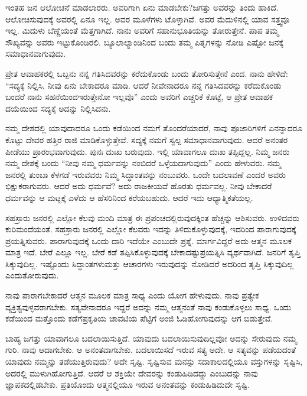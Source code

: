 ಇಂತಹ ಜನ ಆಲೋಚನೆ ಮಾಡಲಾರರು. ಅವರಿಗಾಗಿ ಏನು ಮಾಡಬೇಕು?\break ಜಗತ್ತು ಅವರನ್ನು ತಿಂದು ಹಾಕಿದೆ. ಆಲೋಚಿಸುವುದಕ್ಕೆ ಅವರಲ್ಲಿ ಏನೂ ಇಲ್ಲ. ಅವರ ಮೂಳೆಗಳು ಟೊಳ್ಳಾಗಿವೆ. ಅವರ ಮೆದುಳಿನಲ್ಲಿ ಯಾವ ಸತ್ತ್ವವೂ ಇಲ್ಲ. ಮಿದುಳು ಬೆಣ್ಣೆಯಂತೆ ಮೆತ್ತಗಾಗಿದೆ. ನಾನು ಅವರಿಗೆ ಸಹಾನುಭೂತಿಯನ್ನು ತೋರುತ್ತೇನೆ. ಪಾಪ ತಮ್ಮ ಸೌಖ್ಯವನ್ನು ಅವರು ಇಟ್ಟುಕೊಂಡಿರಲಿ. ಬ್ಯೂಲಾಲ್ಯಾಂಡಿನಿಂದ ಬಂದು ತಮ್ಮ ಪಿತೃಗಳನ್ನು ನೋಡಿ ಎಷ್ಟೋ ಜನಕ್ಕೆ ಸಮಾಧಾನವಾಗುವುದು.

\vskip 6pt

ಪ್ರೇತ ಆವಾಹಕರಲ್ಲಿ ಒಬ್ಬನು ನನ್ನ ಗತಿಸಿದವರನ್ನು ಕರೆದುಕೊಂಡು ಬಂದು ತೋರಿಸುತ್ತೇನೆ ಎಂದ. ನಾನು ಹೇಳಿದೆ: “ಸದ್ಯಕ್ಕೆ ನಿಲ್ಲಿಸಿ, ನೀವು ಏನು ಬೇಕಾದರೂ ಮಾಡಿ. ಆದರೆ ನೀವೇನಾದರೂ ನನ್ನ ಗತಿಸಿದವರನ್ನು ಕರೆದುಕೊಂಡು ಬಂದರೆ ನಾನು ಸಹನೆಯಿಂದ\break ಇರುತ್ತೇನೋ ಇಲ್ಲವೊ” ಎಂದು ಅವರಿಗೆ ಎಚ್ಚರಿಕೆ ಕೊಟ್ಟೆ, ಆ ಪ್ರೇತ ಆವಾಹಕ ದಯೆಯಿಂದ ಸದ್ಯಕ್ಕೆ ಅದನ್ನು ನಿಲ್ಲಿಸಿದನು.

\vskip 6pt

ನಮ್ಮ ದೇಶದಲ್ಲಿ ಯಾವುದಾದರೂ ಒಂದು ಕಡೆಯಿಂದ ನಮಗೆ ತೊಂದರೆಯಾದರೆ, ನಾವು ಪೂಜಾರಿಗಳಿಗೆ ಏನನ್ನಾದರೂ ಕೊಟ್ಟು ದೇವರ ಹತ್ತಿರ ರಾಜಿ ಮಾಡಿಕೊಳ್ಳುತ್ತೇವೆ. ಸದ್ಯಕ್ಕೆ ನಮಗೆ ಸ್ವಲ್ಪ ಸಮಾಧಾನವಾಗುವುದು. ಆದರೆ ಅನಂತರ ಪೀಡೆಯು ಪ್ರಾರಂಭವಾಗುವುದು. ಪುನಃ ದುಃಖ ಬರುವುದು. ಇಲ್ಲಿ ಯಾವಾಗಲೂ ದುಃಖ ತಪ್ಪಿದ್ದಲ್ಲ. ನಿಮ್ಮ ಜನರು ನಮ್ಮ ದೇಶಕ್ಕೆ ಬಂದು “ನೀವು ನಮ್ಮ ಧರ್ಮವನ್ನು ನಂಬಿದರೆ ಒಳ್ಳೆಯದಾಗುವುದು” ಎಂದು ಹೇಳುವರು. ನಮ್ಮ ಜನರಲ್ಲಿ ತುಂಬಾ ಕೆಳಗಡೆ ಇರುವವರು ನಿಮ್ಮ ಸಿದ್ಧಾಂತವನ್ನು ನಂಬುವರು. ಒಂದೇ ಬದಲಾವಣೆ ಎಂದರೆ ಅವರು ಭಿಕ್ಷುಕರಾಗುವರು. ಆದರೆ ಅದು ಧರ್ಮವೆ? ಅದು ರಾಜಕೀಯವೆ ಹೊರತು ಧರ್ಮವಲ್ಲ. ನೀವು ಬೇಕಾದರೆ ಧರ್ಮವನ್ನು ಆ ಮಟ್ಟಕ್ಕೆ ಎಳೆದು ಆ ಹೆಸರಿನಿಂದ ಕರೆಯಬಹುದು. ಆದರೆ ಇದು ಆಧ್ಯಾತ್ಮಿಕತೆಯಲ್ಲ.

\newpage

ಸಹಸ್ರಾರು ಜನರಲ್ಲಿ ಎಲ್ಲೋ ಕೆಲವು ಮಂದಿ ಮಾತ್ರ ಈ ಪ್ರಪಂಚದಲ್ಲಿರುವುದಕ್ಕಿಂತ ಹೆಚ್ಚನ್ನು ಆಶಿಸುವರು. ಉಳಿದವರು ಕುರಿಮಂದೆಯಂತೆ. ಸಹಸ್ರಾರು ಜನರಲ್ಲಿ ಎಲ್ಲೋ ಕೆಲವರು ಇದನ್ನು ತಿಳಿದುಕೊಳ್ಳುವುದಕ್ಕೆ, ಇದರಿಂದ ಪಾರಾಗುವುದಕ್ಕೆ ಪ್ರಯತ್ನಿಸುವರು. ಪಾರಾಗುವುದಕ್ಕೆ ಒಂದು ದಾರಿ ಇದೆಯೇ ಎಂಬುದೇ ಪ್ರಶ್ನೆ. ಮಾರ್ಗವಿದ್ದರೆ ಅದು ಆತ್ಮನ ಮೂಲಕ ಮಾತ್ರ ಇದೆ. ಬೇರೆ ಎಲ್ಲೂ ಇಲ್ಲ. ಬೇರೆ ಕಡೆ ತಪ್ಪಿಸಿಕೊಳ್ಳುವುದಕ್ಕೆ ಬೇಕಾದಷ್ಟು\break ಪ್ರಯತ್ನಿಸಿ ವ್ಯರ್ಥವಾಗಿದೆ. ಜನರಿಗೆ ತೃಪ್ತಿ ಸಿಕ್ಕುವುದಿಲ್ಲ. ಇಷ್ಟೊಂದು ಸಿದ್ಧಾಂತಗಳು\break ಮತ್ತು ಆಚಾರಗಳು ಇರುವುದನ್ನು ನೋಡಿದರೆ ಅದರಿಂದ ತೃಪ್ತಿ ಸಿಕ್ಕುವುದಿಲ್ಲ ಎಂದು\break ತೋರುವುದು.

\vskip 6pt

ನಾವು ಪಾರಾಗಬೇಕಾದರೆ ಆತ್ಮನ ಮೂಲಕ ಮಾತ್ರ ಸಾಧ್ಯ ಎಂದು ಯೋಗ ಹೇಳುವುದು. ನಾವು ಪ್ರತ್ಯೇಕ ವ್ಯಕ್ತಿತ್ವವುಳ್ಳವರಾಗಬೇಕು. ಸತ್ಯವೇನಾದರೂ ಇದ್ದರೆ ಅದನ್ನು ನಮ್ಮ ಆತ್ಮನಂತೆ ನಾವು ಕಂಡುಕೊಳ್ಳಲು ಸಾಧ್ಯ. ಒಂದು ಕಡೆಯಿಂದ ಮತ್ತೊಂದು ಕಡೆಗೆ\break ಪ್ರಕೃತಿಯ ಚಾವಟಿಯ ಪೆಟ್ಟಿಗೆ ಅಂಜಿ ಓಡಿಹೋಗುವುದನ್ನು ಆಗ ಬಿಡುತ್ತೇವೆ.

\vskip 6pt

ಬಾಹ್ಯ ಜಗತ್ತು ಯಾವಾಗಲೂ ಬದಲಾಯಿಸುತ್ತಿದೆ. ಯಾವುದು ಬದಲಾಯಿಸುವುದಿಲ್ಲವೋ ಅದನ್ನು ಸೇರುವುದು ನಮ್ಮ ಗುರಿ. ನಾವು ಆದಾಗಬೇಕು. ಆ ಅನಂತವಾಗಬೇಕು. ಬದಲಾಯಿಸದೆ ಇರುವ ಸತ್ಯ ಅದೇ. ಆ ಸತ್ಯವನ್ನು ಪಡೆಯದಂತೆ ಯಾವುದು ನಮ್ಮನ್ನು ತಡೆಯುತ್ತಿರುವುದು? ಅದೇ ಸೃಷ್ಟಿ. ಸೃಷ್ಟಿಸುವ ಮನಸ್ಸು ಸದಾಕಾಲದಲ್ಲಿಯೂ ವಸ್ತುಗಳನ್ನು ಸೃಷ್ಟಿಸಿ, ಅದರಲ್ಲಿ ಮುಳುಗಿಹೋಗುತ್ತಿದೆ. ಆದರೆ ಆ ಶಕ್ತಿಯೇ ದೇವರನ್ನು ಕಂಡುಹಿಡಿದದ್ದು ಎಂಬುದನ್ನು ನಾವು ಜ್ಞಾಪಕದಲ್ಲಿಡಬೇಕು. ಪ್ರತಿಯೊಂದು ಆತ್ಮನಲ್ಲಿಯೂ ಇರುವ ಅನಂತವನ್ನು ಕಂಡುಹಿಡಿದುದೇ ಸೃಷ್ಟಿ.

